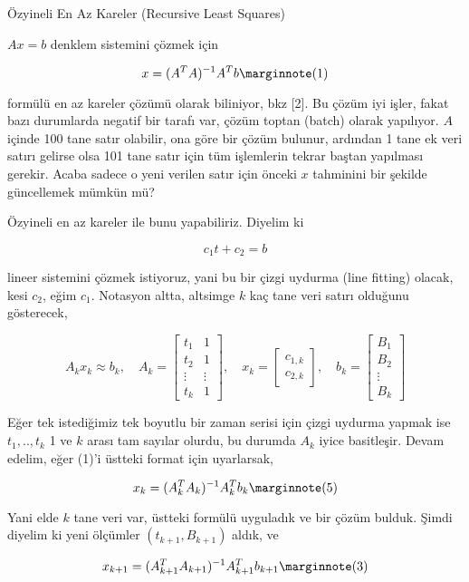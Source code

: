\documentclass[12pt,fleqn]{article}\usepackage{../../common}
\begin{document}
Özyineli En Az Kareler (Recursive Least Squares)

$Ax = b$ denklem sistemini çözmek için 

$$ 
x = (A^TA)^{-1}A^Tb  
\mlabel{1} 
$$ 

formülü en az kareler çözümü olarak biliniyor, bkz [2]. Bu çözüm iyi işler,
fakat bazı durumlarda negatif bir tarafı var, çözüm toptan (batch) olarak
yapılıyor. $A$ içinde 100 tane satır olabilir, ona göre bir çözüm bulunur,
ardından 1 tane ek veri satırı gelirse olsa 101 tane satır için tüm
işlemlerin tekrar baştan yapılması gerekir. Acaba sadece o yeni verilen
satır için önceki $x$ tahminini bir şekilde güncellemek mümkün mü?

Özyineli en az kareler ile bunu yapabiliriz. Diyelim ki 

$$ c_1 t + c_2 = b $$

lineer sistemini çözmek istiyoruz, yani bu bir çizgi uydurma (line fitting)
olacak, kesi $c_2$, eğim $c_1$. Notasyon altta, altsimge $k$ kaç tane veri
satırı olduğunu gösterecek,

$$ A_kx_k \approx b_k, \quad 
A_k = \left[\begin{array}{cc}
t_1 & 1 \\
t_2 & 1 \\
\vdots & \vdots \\
t_k & 1 
\end{array}\right], \quad 
x_k = \left[\begin{array}{r}
c_{1,k} \\ c_{2,k}
\end{array}\right], \quad
b_k = \left[\begin{array}{r}
B_1 \\ B_2 \\ \vdots \\ B_k
\end{array}\right]
$$

Eğer tek istediğimiz tek boyutlu bir zaman serisi için çizgi uydurma yapmak
ise $t_1,..,t_k$ 1 ve $k$ arası tam sayılar olurdu, bu durumda $A_k$ iyice
basitleşir. Devam edelim, eğer (1)'i üstteki format için uyarlarsak,

$$ 
x_k = (A_k^TA_k)^{-1}A_k^T b_k 
\mlabel{5} 
$$

Yani elde $k$ tane veri var, üstteki formülü uyguladık ve bir çözüm
bulduk. Şimdi diyelim ki yeni ölçümler $(t_{k+1}, B_{k+1})$ aldık, ve 

$$ 
x_{k+1} = (A_{k+1}^TA_{k+1})^{-1}A_{k+1}^T b_{k+1} 
\mlabel{3} 
$$
\end{document}
